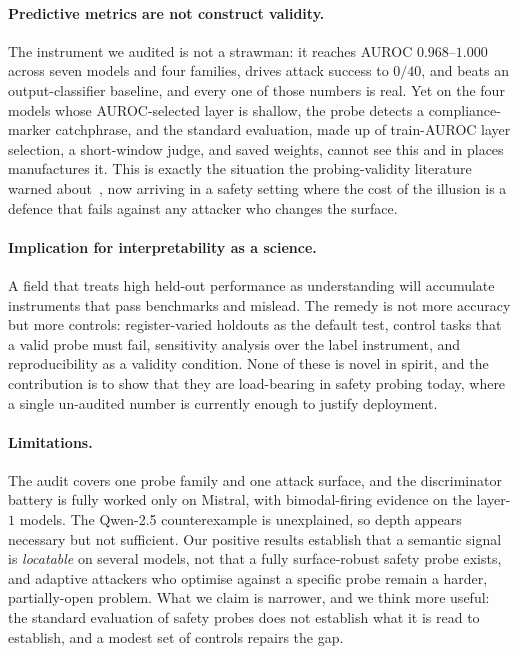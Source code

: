 \documentclass{article}
\begin{document}
\paragraph{Predictive metrics are not construct validity.} The instrument we audited is not a strawman: it reaches AUROC $0.968$--$1.000$ across seven models and four families, drives attack success to $0/40$, and beats an output-classifier baseline, and every one of those numbers is real. Yet on the four models whose AUROC-selected layer is shallow, the probe detects a compliance-marker catchphrase, and the standard evaluation, made up of train-AUROC layer selection, a short-window judge, and saved weights, cannot see this and in places manufactures it. This is exactly the situation the probing-validity literature warned about~\citep{hewitt2019control,belinkov2022probing,bolukbasi2021illusion}, now arriving in a safety setting where the cost of the illusion is a defence that fails against any attacker who changes the surface.

\paragraph{Implication for interpretability as a science.} A field that treats high held-out performance as understanding will accumulate instruments that pass benchmarks and mislead. The remedy is not more accuracy but more controls: register-varied holdouts as the default test, control tasks that a valid probe must fail, sensitivity analysis over the label instrument, and reproducibility as a validity condition. None of these is novel in spirit, and the contribution is to show that they are load-bearing in safety probing today, where a single un-audited number is currently enough to justify deployment.

\paragraph{Limitations.} The audit covers one probe family and one attack surface, and the discriminator battery is fully worked only on Mistral, with bimodal-firing evidence on the layer-$1$ models. The Qwen-2.5 counterexample is unexplained, so depth appears necessary but not sufficient. Our positive results establish that a semantic signal is \emph{locatable} on several models, not that a fully surface-robust safety probe exists, and adaptive attackers who optimise against a specific probe remain a harder, partially-open problem. What we claim is narrower, and we think more useful: the standard evaluation of safety probes does not establish what it is read to establish, and a modest set of controls repairs the gap.
\end{document}
